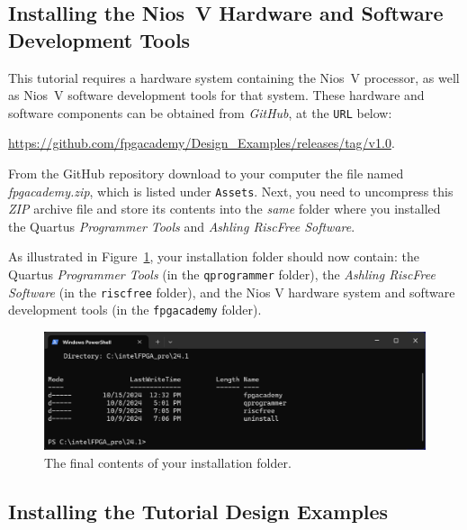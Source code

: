 \documentclass[11pt, twoside, pdftex]{article}
\begin{document}
\subsection{Installing the Nios~V Hardware and Software Development Tools}
\label{sec:hw_sw}

This tutorial requires a hardware system containing the Nios~V processor, as well as Nios~V
software development tools for that system. These hardware and software components can be
obtained from {\it GitHub}, at the \texttt{URL} below:

{\href{https://github.com/fpgacademy/Design\_Examples/releases/tag/v1.0} 
{https://github.com/fpgacademy/Design\_Examples/releases/tag/v1.0}.

From the GitHub repository download to your computer the file named {\it fpgacademy.zip}, 
which is listed under \texttt{Assets}. Next, you need to uncompress this {\it ZIP} archive 
file and store its contents into the {\it same} folder where you installed the Quartus 
{\it Programmer Tools} and {\it Ashling RiscFree Software}.

As illustrated in Figure~\ref{fig:goterdone}, your installation folder should now 
contain: the Quartus {\it Programmer Tools} (in the \texttt{qprogrammer} folder), the 
{\it Ashling RiscFree Software} (in the \texttt{riscfree} folder), and the Nios V 
hardware system and software development tools (in the \texttt{fpgacademy} folder).
~\\
\begin{figure}[h]
    \begin{center}
        \includegraphics[width=.9\linewidth]{figures/goterdone.png}
        \caption{The final contents of your installation folder.}
        \label{fig:goterdone}
    \end{center}
\end{figure}

\subsection{Installing the Tutorial Design Examples}
\label{sec:egs}

}
\end{document}
